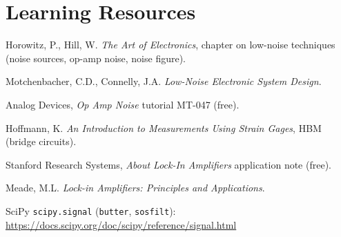 \documentclass[11pt,a4paper]{article}
\begin{document}
\section*{Learning Resources}
\begin{resources}
  \item Horowitz, P., Hill, W. \emph{The Art of Electronics}, chapter on low-noise techniques (noise sources, op-amp noise, noise figure).
  \item Motchenbacher, C.D., Connelly, J.A. \emph{Low-Noise Electronic System Design}.
  \item Analog Devices, \emph{Op Amp Noise} tutorial MT-047 (free).
\end{resources}
\begin{resources}
  \item Hoffmann, K. \emph{An Introduction to Measurements Using Strain Gages}, HBM (bridge circuits).
  \item Stanford Research Systems, \emph{About Lock-In Amplifiers} application note (free).
  \item Meade, M.L. \emph{Lock-in Amplifiers: Principles and Applications}.
\end{resources}
\begin{resources}
  \item SciPy \texttt{scipy.signal} (\texttt{butter}, \texttt{sosfilt}): \url{https://docs.scipy.org/doc/scipy/reference/signal.html}
\end{resources}

\evaluation
\end{document}
